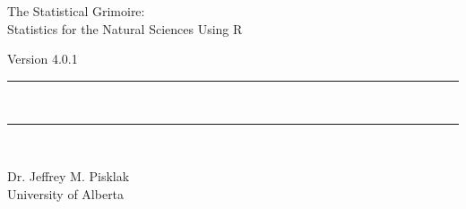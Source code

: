 {}
{
\Huge\centering\headingfont The Statistical Grimoire: \\
Statistics for the Natural Sciences Using R\\

\vspace{0.5em}

\small\mdseries\raggedright Version 4.0.1

\rule{\linewidth}{1pt}\\[-6mm]
\rule{\linewidth}{2pt}\\

}

\vskip 2cm

\begin{center}
\Large Dr. Jeffrey M. Pisklak \\
\vspace{0.5em}
\large University of Alberta
\end{center}

\vfill

